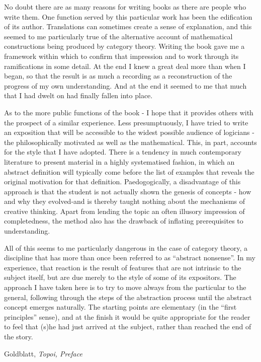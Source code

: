 \documentclass[11pt,openany]{article}
\begin{document}
\pagebreak
\epigraph{No doubt there are as many reasons for writing books as there are people
who write them. One function served by this particular work has been the
edification of its author. Translations can sometimes create a sense of
explanation, and this seemed to me particularly true of the alternative
account of mathematical constructions being produced by category
theory. Writing the book gave me a framework within which to confirm
that impression and to work through its ramifications in some detail. At
the end I knew a great deal more than when I began, so that the result is
as much a recording as a reconstruction of the progress of my own
understanding. And at the end it seemed to me that much that I had
dwelt on had finally fallen into place.
\par
As to the more public functions of the book - I hope that it provides
others with the prospect of a similar experience. Less presumptuously, I
have tried to write an exposition that will be accessible to the widest
possible audience of logicians - the philosophically motivated as well as
the mathematical. This, in part, accounts for the style that I have adopted.
There is a tendency in much contemporary literature to present material
in a highly systematised fashion, in which an abstract definition will
typically come before the list of examples that reveals the original
motivation for that definition. Paedogogically, a disadvantage of this
approach is that the student is not actually shown the genesis of concepts -
how and why they evolved-and is thereby taught nothing about the
mechanisms of creative thinking. Apart from lending the topic an often
illusory impression of completedness, the method also has the drawback
of inflating prerequisites to understanding.
\par
All of this seems to me particularly dangerous in the case of category
theory, a discipline that has more than once been referred to as ``abstract
nonsense''. In my experience, that reaction is the result of features that
are not intrinsic to the subject itself, but are due merely to the style of
some of its expositors. The approach I have taken here is to try to move
always from the particular to the general, following through the steps of
the abstraction process until the abstract concept emerges naturally. The
starting points are elementary (in the ``first principles'' sense), and at the
finish it would be quite appropriate for the reader to feel that (s)he had
just arrived at the subject, rather than reached the end of the story.}
{Goldblatt, \textit{Topoi, Preface}~\cite{goldblatt-1984-topoi}}
\setcounter{currentlevel}{\value{baseSectionLevel}}
\label{sec:Preface-2020-08}
\end{document}
